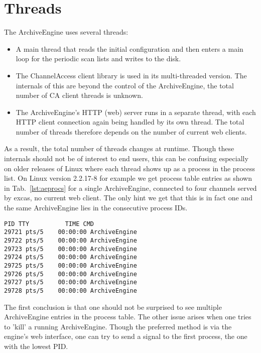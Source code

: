 \section{Threads} %
The ArchiveEngine uses several threads:
\begin{itemize}
\item A main thread that reads the initial configuration and then
  enters a main loop for the periodic scan lists and writes to the
  disk.
\item The ChannelAccess client library is used in its multi-threaded
  version. The internals of this are beyond the control of the
  ArchiveEngine, the total number of CA client threads is unknown.
\item The ArchiveEngine's HTTP (web) server runs in a separate thread,
  with each HTTP client connection again being handled by its own
  thread. The total number of threads therefore depends on the number
  of current web clients.
\end{itemize}
As a result, the total number of threads changes at runtime. Though
these internals should not be of interest to end users, this can be
confusing especially on older releases of Linux where each thread
shows up as a process in the process list.
On Linux version 2.2.17-8 for example we get process table entries as
shown in Tab.~\ref{lst:aeprocs} for a single ArchiveEngine, connected
to four channels served by excas, no current web client. The only hint
we get that this is in fact one and the same ArchiveEngine lies in the
consecutive process IDs.

\begin{lstlisting}[float=htb,
caption={Output of Linux 'ps' process list command, see text.},
label=lst:aeprocs]
  PID TTY          TIME CMD
29721 pts/5    00:00:00 ArchiveEngine
29722 pts/5    00:00:00 ArchiveEngine
29723 pts/5    00:00:00 ArchiveEngine
29724 pts/5    00:00:00 ArchiveEngine
29725 pts/5    00:00:00 ArchiveEngine
29726 pts/5    00:00:00 ArchiveEngine
29727 pts/5    00:00:00 ArchiveEngine
29728 pts/5    00:00:00 ArchiveEngine   
\end{lstlisting}

The first conclusion is that one should not be surprised to see
multiple ArchiveEngine entries in the process table.
The other issue arises when one tries to 'kill' a running
ArchiveEngine. Though the preferred method is via the engine's web
interface, one can try to send a signal to the first process, the one
with the lowest PID.

